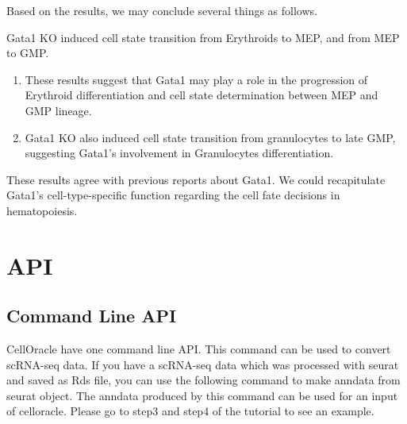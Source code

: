 \documentclass[letterpaper,10pt,english]{sphinxmanual}
\begin{document}
Based on the results, we may conclude several things as follows.

Gata1 KO induced cell state transition from Erythroids to MEP, and from MEP to GMP.
\begin{enumerate}
\item {} 
These results suggest that Gata1 may play a role in the progression of Erythroid differentiation and cell state determination between MEP and GMP lineage.

\item {} 
Gata1 KO also induced cell state transition from granulocytes to late GMP, suggesting Gata1’s involvement in Granulocytes differentiation.

\end{enumerate}

These results agree with previous reports about Gata1. We could recapitulate Gata1’s cell-type-specific function regarding the cell fate decisions in hematopoiesis.

{
%
\begin{sphinxVerbatim}[commandchars=\\\{\}]
\llap{\color{nbsphinxin}[ ]:\,\hspace{\fboxrule}\hspace{\fboxsep}}
\end{sphinxVerbatim}
}


\section{API}
\label{\detokenize{modules/index:api}}\label{\detokenize{modules/index::doc}}

\subsection{Command Line API}
\label{\detokenize{modules/index:command-line-api}}
CellOracle have one command line API. This command can be used to convert scRNA-seq data.
If you have a scRNA-seq data which was processed with seurat and saved as Rds file, you can use the following command to make anndata from seurat object.
The anndata produced by this command can be used for an input of celloracle. Please go to step3 and step4 of the tutorial to see an example.

%
\begin{sphinxVerbatim}[commandchars=\\\{\}]
  
\end{sphinxVerbatim}
\end{document}
